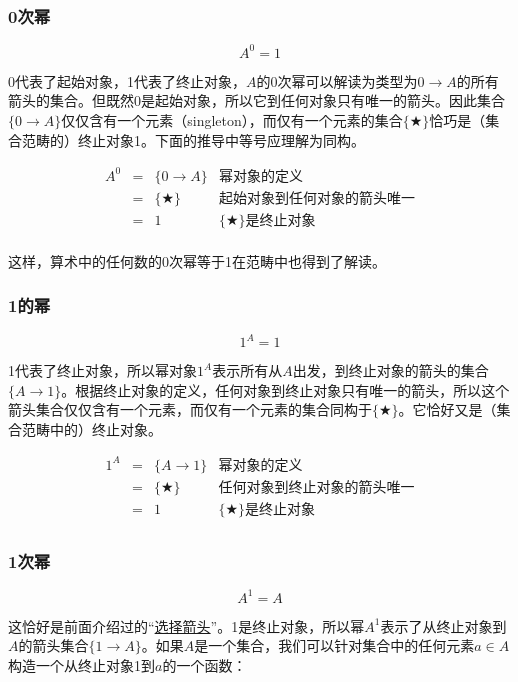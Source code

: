 \documentclass[b5paper]{ctexart}
\begin{document}
\subsubsection{0次幂}

\[
  A^0 = 1
\]

0代表了起始对象，1代表了终止对象，$A$的0次幂可以解读为类型为$0 \to A$的所有箭头的集合。但既然0是起始对象，所以它到任何对象只有唯一的箭头。因此集合$\{ 0 \to A \}$仅仅含有一个元素（singleton），而仅有一个元素的集合$\{ \bigstar \}$恰巧是（集合范畴的）终止对象1。下面的推导中等号应理解为同构。

\[
\begin{array}{rcll}
A^0 & = & \{ 0 \to A \} & \text{幂对象的定义} \\
    & = & \{ \bigstar \} & \text{起始对象到任何对象的箭头唯一} \\
    & = & 1 & \{ \bigstar \}\text{是终止对象} \\
\end{array}
\]

这样，算术中的任何数的0次幂等于1在范畴中也得到了解读。

\subsubsection{1的幂}

\[
  1^A = 1
\]

1代表了终止对象，所以幂对象$1^A$表示所有从$A$出发，到终止对象的箭头的集合$\{ A \to 1 \}$。根据终止对象的定义，任何对象到终止对象只有唯一的箭头，所以这个箭头集合仅仅含有一个元素，而仅有一个元素的集合同构于$\{ \bigstar \}$。它恰好又是（集合范畴中的）终止对象。

\[
\begin{array}{rcll}
1^A & = & \{ A \to 1 \} & \text{幂对象的定义} \\
    & = & \{ \bigstar \} & \text{任何对象到终止对象的箭头唯一} \\
    & = & 1 & \{ \bigstar \}\text{是终止对象} \\
\end{array}
\]

\subsubsection{1次幂}

\[
  A^1 = A
\]

这恰好是前面介绍过的“\hyperref[sec:selection-arrow]{选择箭头}”。1是终止对象，所以幂$A^1$表示了从终止对象到$A$的箭头集合$\{ 1 \to A\}$。如果$A$是一个集合，我们可以针对集合中的任何元素$a \in A$构造一个从终止对象1到$a$的一个函数：
\end{document}
